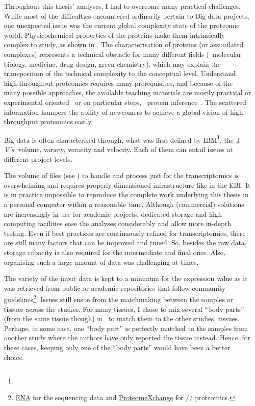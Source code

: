 Throughout this thesis' analyses,
I had to overcome many practical challenges.
While most of the difficulties encountered ordinarily pertain to Big data projects,
one unexpected issue was
the current global complexity state of the proteomic world.
Physicochemical properties of the proteins make them
intrinsically complex to study,
as shown in .
The characterisation of proteins (or assimilated complexes) represents
a technical obstacle for many different fields
(\eg\ molecular biology, medicine, drug design, green chemistry),
which may explain the transposition of the technical complexity
to the conceptual level.
Understand high-throughput proteomics requires many prerequisites,
and because of the many possible approaches,
the available teaching materials are mostly
practical or experimental oriented~ or
on particular steps, \eg\ protein inference~.
The scattered information hampers the ability of newcomers
to achieve a global vision of high-throughput proteomics easily.\mybr\

Big data is often characterised through, what was first defined by
\href{https://www.ibm.com}{IBM}\footnote{},
the \emph{4 V's}: volume, variety, veracity and velocity.
Each of them can entail issues at different project levels.

The volume of files (see )
to handle and process just for the transcriptomics
is overwhelming and requires properly dimensioned infrastructure
like in the \gls{EBI}.
It is in practice impossible to reproduce the complete work underlying
this thesis in a personal computer within a reasonable time.
Although (commercial) solutions are increasingly in use for academic projects,
dedicated storage and high computing facilities ease the analyses considerably
and allow more in-depth testing.
Even if best practices are continuously refined for transcriptomics,
there are still many factors that can be improved and tuned.
So, besides the raw data,
storage capacity is also required for the intermediate and final ones.
Also, organising such a large amount of data was challenging at times.

The variety of the input data is kept to a minimum for the expression value
as it was retrieved from public or academic repositories
that follow community guidelines\footnote{%
\href{https://www.ebi.ac.uk/ena}{ENA} for the sequencing data and
\href{http://www.proteomexchange.org}{ProteomeXchange} for \ms/\ms/ proteomics.
}.
Issues still ensue from the matchmaking
between the samples or tissues across the studies.
For many tissues, I chose to mix several \enquote{body parts}
(from the same tissue though) in \gtex\
to match them to the other studies' tissues.
Perhaps, in some case, one \enquote{body part} is perfectly matched
to the samples from another study
where the authors have only reported the tissue instead.
Hence, for these cases,
keeping only one of the \enquote{body parts}
would have been a better choice.

